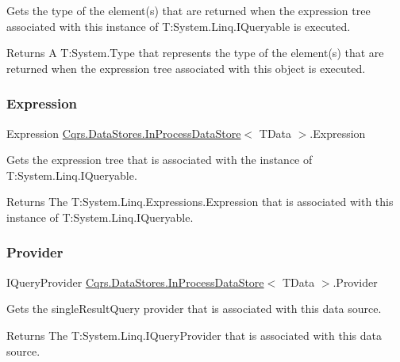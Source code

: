 Gets the type of the element(s) that are returned when the expression tree associated with this instance of T\+:\+System.\+Linq.\+I\+Queryable is executed. 

\begin{DoxyReturn}{Returns}
A T\+:\+System.\+Type that represents the type of the element(s) that are returned when the expression tree associated with this object is executed. 
\end{DoxyReturn}
\mbox{\label{classCqrs_1_1DataStores_1_1InProcessDataStore_a459174c411a0df2b4ec1e48a3b36f884}} 
\subsubsection{\texorpdfstring{Expression}{Expression}}
{\footnotesize\ttfamily Expression \hyperlink{classCqrs_1_1DataStores_1_1InProcessDataStore}{Cqrs.\+Data\+Stores.\+In\+Process\+Data\+Store}$<$ T\+Data $>$.Expression\hspace{0.3cm}{\ttfamily [get]}}



Gets the expression tree that is associated with the instance of T\+:\+System.\+Linq.\+I\+Queryable. 

\begin{DoxyReturn}{Returns}
The T\+:\+System.\+Linq.\+Expressions.\+Expression that is associated with this instance of T\+:\+System.\+Linq.\+I\+Queryable. 
\end{DoxyReturn}
\mbox{\label{classCqrs_1_1DataStores_1_1InProcessDataStore_a9f4e487d52f69245266afdf303d585c1}} 
\subsubsection{\texorpdfstring{Provider}{Provider}}
{\footnotesize\ttfamily I\+Query\+Provider \hyperlink{classCqrs_1_1DataStores_1_1InProcessDataStore}{Cqrs.\+Data\+Stores.\+In\+Process\+Data\+Store}$<$ T\+Data $>$.Provider\hspace{0.3cm}{\ttfamily [get]}}



Gets the single\+Result\+Query provider that is associated with this data source. 

\begin{DoxyReturn}{Returns}
The T\+:\+System.\+Linq.\+I\+Query\+Provider that is associated with this data source. 
\end{DoxyReturn}
